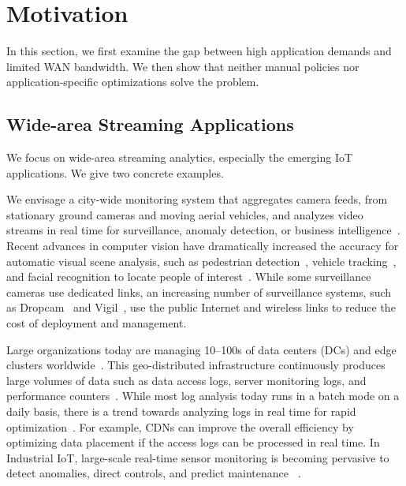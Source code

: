 \section{Motivation}
\label{sec:motivation}

In this section, we first examine the gap between high application demands and
limited WAN bandwidth. We then show that neither manual policies nor
application-specific optimizations solve the problem.

\subsection{Wide-area Streaming Applications}
\label{sec:wide-area-streaming}

We focus on wide-area streaming analytics, especially the emerging IoT applications. We give two concrete examples.

 We envisage a city-wide monitoring system that
aggregates camera feeds, from stationary ground cameras and moving aerial
vehicles, and analyzes video streams in real time for surveillance, anomaly
detection, or business intelligence~\cite{oh2011large}. Recent advances in
computer vision have dramatically increased the accuracy for automatic visual
scene analysis, such as pedestrian detection~\cite{dollar2012pedestrian},
vehicle tracking~\cite{coifman1998real}, and facial recognition to locate people
of interest~\cite{Lu:2015:SHF:2888116.2888245, parkhi2015deep}. While some
surveillance cameras use dedicated links, an increasing number of surveillance
systems, such as Dropcam~\cite{dropcam} and Vigil~\cite{zhang2015design}, use
the public Internet and wireless links to reduce the cost of deployment and
management.


 Large organizations today are managing
10--100s of data centers (DCs) and edge clusters
worldwide~\cite{calder2013mapping}. This geo-distributed infrastructure
continuously produces large volumes of data such as data access logs, server
monitoring logs, and performance counters~\cite{alspaugh2014analyzing,
  pu2015low, vulimiri2015global}. While most log analysis today runs in a batch
mode on a daily basis, there is a trend towards analyzing logs in real time for
rapid optimization~\cite{rabkin2014aggregation}. For example, CDNs can improve
the overall efficiency by optimizing data placement if the access logs can be
processed in real time. In Industrial IoT, large-scale real-time sensor
monitoring is becoming pervasive to detect anomalies, direct controls, and
predict maintenance ~\cite{balani2016enterprise, ge}.

